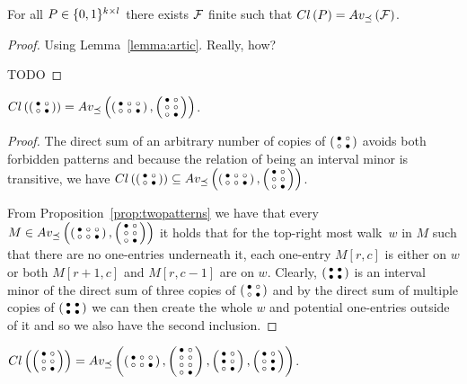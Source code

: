 \begin{thm}
For all $P\in\Pat$ there exists $\class{F}$ finite such that $\Cl{P}=\Avm{\class{F}}$.
\end{thm}
\begin{proof}
Using Lemma~\ref{lemma:artic}. Really, how? 

TODO
\end{proof}

\begin{thm}
$\Cl{\smm{\bullet&\circ\\\circ&\bullet}}=\Avm{\smm{\bullet&\circ&\circ\\\circ&\circ&\bullet},\smm{\bullet&\circ\\\circ&\circ\\\circ&\bullet}}$.
\end{thm}
\begin{proof}
The direct sum of an arbitrary number of copies of $\smm{\bullet&\circ\\\circ&\bullet}$ avoids both forbidden patterns and because the relation of being an interval minor is transitive, we have $\Cl{\smm{\bullet&\circ\\\circ&\bullet}}\subseteq\Avm{\smm{\bullet&\circ&\circ\\\circ&\circ&\bullet},\smm{\bullet&\circ\\\circ&\circ\\\circ&\bullet}}$.

From Proposition~\ref{prop:twopatterns} we have that every $M\in\Avm{\smm{\bullet&\circ&\circ\\\circ&\circ&\bullet},\smm{\bullet&\circ\\\circ&\circ\\\circ&\bullet}}$ it holds that for the top-right most walk~$w$ in $M$ such that there are no one-entries underneath it, each one-entry $M[r,c]$ is either on $w$ or both $M[r+1,c]$ and $M[r,c-1]$ are on $w$. Clearly, $\smm{\bullet&\bullet\\\bullet&\bullet}$ is an interval minor of the direct sum of three copies of $\smm{\bullet&\circ\\\circ&\bullet}$ and by the direct sum of multiple copies of $\smm{\bullet&\bullet\\\bullet&\bullet}$ we can then create the whole $w$ and potential one-entries outside of it and so we also have the second inclusion.
\end{proof}

\begin{thm}
$\Cl{\smm{\bullet&\circ\\\circ&\circ\\\circ&\bullet}}=\Avm{\smm{\bullet&\circ&\circ\\\circ&\circ&\bullet},\smm{\bullet&\circ\\\circ&\circ\\\circ&\circ\\\circ&\bullet},\smm{\bullet&\circ\\\bullet&\circ\\\circ&\bullet},\smm{\bullet&\circ\\\circ&\bullet\\\circ&\bullet}}$.
\end{thm}

